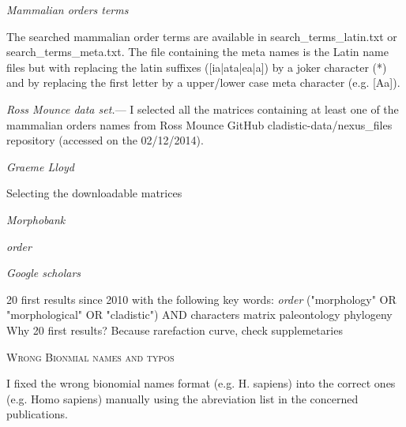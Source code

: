 \documentclass[12pt,letterpaper]{article}
\renewcommand{\section}[1]{%
\bigskip
\begin{center}
\begin{Large}
\normalfont\scshape #1
\medskip
\end{Large}
\end{center}}
\renewcommand{\subsection}[1]{%
\bigskip
\begin{center}
\begin{large}
\normalfont\itshape #1
\end{large}
\end{center}}
\renewcommand{\subsubsection}[1]{%
\vspace{2ex}
\noindent
\textit{#1.}---}
\begin{document}
\subsection{Mammalian orders terms}
The searched mammalian order terms are available in search_terms_latin.txt or search_terms_meta.txt. The file containing the meta names is the Latin name files but with replacing the latin suffixes ([ia|ata|ea|a]) by a joker character (*) and by replacing the first letter by a upper/lower case meta character (e.g. [Aa]).

\subsubsection{Ross Mounce data set}
I selected all the matrices containing at least one of the mammalian orders names from Ross Mounce GitHub cladistic-data/nexus_files repository (accessed on the 02/12/2014).

\subsection{Graeme Lloyd}
Selecting the downloadable matrices

\subsection{Morphobank}
\textit{order}

\subsection{Google scholars}
20 first results since 2010 with the following key words:
\textit{order} ("morphology" OR "morphological" OR "cladistic") AND characters matrix paleontology phylogeny
Why 20 first results? Because rarefaction curve, check supplemetaries

\section{Wrong Bionmial names and typos}
I fixed the wrong bionomial names format (e.g. H. sapiens) into the correct ones (e.g. Homo sapiens) manually using the abreviation list in the concerned publications.


\end{document}
